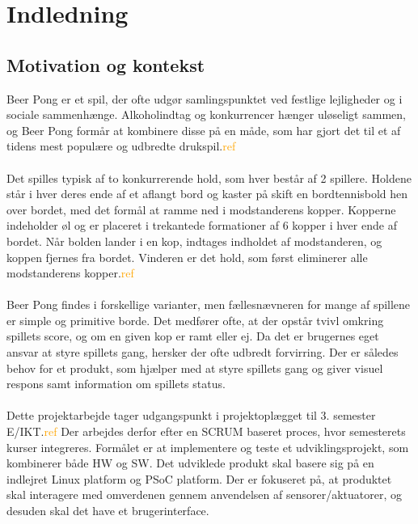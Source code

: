 \documentclass[Rapport/Rapport_main.tex]{subfiles}
\begin{document}
\section{Indledning}\label{sec:Indledning}
\subsection{Motivation og kontekst}
Beer Pong er et spil, der ofte udgør samlingspunktet ved festlige lejligheder og i sociale sammenhænge. Alkoholindtag og konkurrencer hænger uløseligt sammen, og Beer Pong formår at kombinere disse på en måde, som har gjort det til et af tidens mest populære og udbredte drukspil.\textcolor{orange}{ref} \\\\Det spilles typisk af to konkurrerende hold, som hver består af 2 spillere. Holdene står i hver deres ende af et aflangt bord og kaster på skift en bordtennisbold hen over bordet, med det formål at ramme ned i modstanderens kopper. Kopperne indeholder øl og er placeret i trekantede formationer af 6 kopper i hver ende af bordet. Når bolden lander i en kop, indtages indholdet af modstanderen, og koppen fjernes fra bordet. Vinderen er det hold, som først eliminerer alle modstanderens kopper.\textcolor{orange}{ref}
\\\\Beer Pong findes i forskellige varianter, men fællesnævneren for mange af spillene er simple og primitive borde. Det medfører ofte, at der opstår tvivl omkring spillets score, og om en given kop er ramt eller ej. Da det er brugernes eget ansvar at styre spillets gang, hersker der ofte udbredt forvirring. Der er således behov for et produkt, som hjælper med at styre spillets gang og giver visuel respons samt information om spillets status.
\\\\Dette projektarbejde tager udgangspunkt i projektoplægget til 3. semester E/IKT.\textcolor{orange}{ref} Der arbejdes derfor efter en SCRUM baseret proces, hvor semesterets kurser integreres. Formålet er at implementere og teste et udviklingsprojekt, som kombinerer både HW og SW. Det udviklede produkt skal basere sig på en indlejret Linux platform og PSoC platform. Der er fokuseret på, at produktet skal interagere med omverdenen gennem anvendelsen af sensorer/aktuatorer, og desuden skal det have et brugerinterface.\\\\
\end{document}
